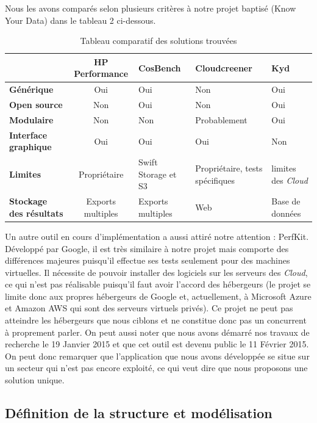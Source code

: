 \documentclass[10pt]{article}
\begin{document}
Nous les avons comparés selon plusieurs critères à notre projet baptisé \KYD (Know Your Data) dans le tableau 2 ci-dessous.

\begin{table}[h] \caption{Tableau comparatif des solutions trouvées}
\renewcommand{\arraystretch}{1.5} \begin{center}
\begin{tabular}{|p{2cm}|c|p{2cm}|p{3cm}|p{2cm}|} \hline & \bf HP Performance &
\bf CosBench & \bf Cloudcreener & \bf Kyd  \\ \hline \bf\centering Générique &
Oui & Oui & Non & Oui \\ \hline \bf\centering Open source & Non & Oui & Non &
Oui \\ \hline \bf\centering Modulaire & Non & Non & Probablement & Oui \\
\hline \bf\centering Interface graphique & Oui & Oui & Oui & Non \\ \hline
\bf\centering Limites & Propriétaire & Swift Storage et S3 & Propriétaire,
tests spécifiques & limites des \textit{Cloud} \\ \hline \bf\centering Stockage
des résultats & Exports multiples & Exports multiples & Web & Base de données
\\ \hline \end{tabular} \end{center} \end{table}

Un autre outil en cours d'implémentation a aussi attiré notre attention :
PerfKit. Développé par Google, il est très similaire à notre projet mais
comporte des différences majeures puisqu'il effectue ses tests seulement pour
des machines virtuelles. Il nécessite de pouvoir installer des logiciels sur
les serveurs des \textit{Cloud}, ce qui n'est pas réalisable puisqu'il faut
avoir l'accord des hébergeurs (le projet se limite donc aux propres hébergeurs
de Google et, actuellement, à Microsoft Azure et Amazon AWS qui sont des
serveurs virtuels privés). Ce projet ne peut pas atteindre les hébergeurs que
nous ciblons et ne constitue donc pas un concurrent à proprement parler. On
peut aussi noter que nous avons démarré nos travaux de recherche le 19 Janvier
2015 et que cet outil est devenu public le 11 Février 2015. On peut donc
remarquer que l’application que nous avons développée se situe sur un secteur
qui n’est pas encore exploité, ce qui veut dire que nous proposons une solution
unique.

\subsection{Définition de la structure et modélisation}
\end{document}
